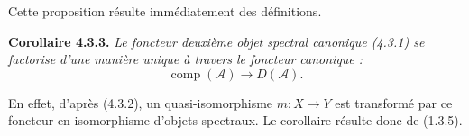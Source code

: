 \noindent Cette proposition résulte immédiatement des définitions.

\medskip\noindent\textbf{Corollaire 4.3.3.}\quad
\textit{Le foncteur deuxième objet spectral canonique (4.3.1) se factorise
d'une manière unique à travers le foncteur canonique :}
\[
\operatorname{comp}(\mathcal A)\longrightarrow D(\mathcal A).
\]

En effet, d'après (4.3.2), un quasi-isomorphisme
$m\colon X\longrightarrow Y$ est transformé par ce foncteur en isomorphisme
d'objets spectraux. Le corollaire résulte donc de (1.3.5).
\endgroup
